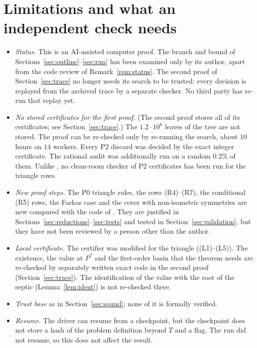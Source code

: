 \documentclass[11pt]{amsart}
\theoremstyle{definition}
\begin{document}
\section{Limitations and what an independent check needs}\label{sec:limits}

\begin{itemize}
\item \emph{Status.} This is an AI-assisted computer proof. The branch and bound of Sections~\ref{sec:outline}--\ref{sec:run} has been examined only by its author, apart from the code review of Remark~\ref{rem:status}. The second proof of Section~\ref{sec:trace} no longer needs its search to be trusted: every decision is replayed from the archived trace by a separate checker. No third party has re-run that replay yet.
\item \emph{No stored certificates for the first proof.} (The second proof stores all of its certificates; see Section~\ref{sec:trace}.) The $1.2\cdot10^8$ leaves of the tree are not stored. The proof can be re-checked only by re-running the search, about $10$ hours on $14$ workers. Every P2 discard was decided by the exact integer certificate. The rational audit was additionally run on a random $0.2\%$ of them. Unlike \cite{N9}, no clean-room checker of P2 certificates has been run for the triangle rows.
\item \emph{New proof steps.} The P0 triangle rules, the rows (R4)--(R7), the conditional (R5) rows, the Farkas case and the cover with non-isometric symmetries are new compared with the code of \cite{N9}. They are justified in Sections~\ref{sec:reductions}--\ref{sec:tests} and tested in Section~\ref{sec:validation}, but they have not been reviewed by a person other than the author.
\item \emph{Local certificate.} The certifier was modified for the triangle ((L1)--(L5)). The existence, the value at $P^*$ and the first-order basin that the theorem needs are re-checked by separately written exact code in the second proof (Section~\ref{sec:trace}). The identification of the value with the root of the septic (Lemma~\ref{lem:ident}) is not re-checked there.
\item \emph{Trust base} as in Section~\ref{sec:sound}; none of it is formally verified.
\item \emph{Resume.} The driver can resume from a checkpoint, but the checkpoint does not store a hash of the problem definition beyond $T$ and a flag. The run did not resume, so this does not affect the result.
\end{itemize}
\end{document}

